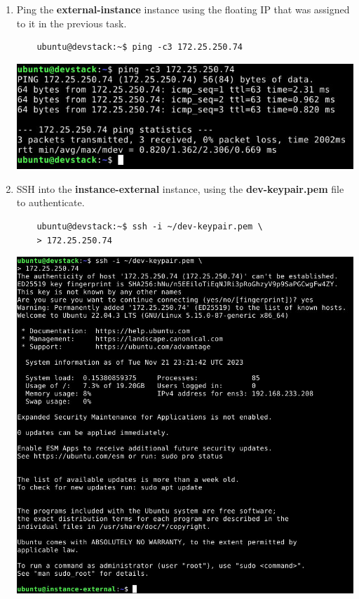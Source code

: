 \documentclass[letterpaper, 12pt]{article}
\begin{document}
\begin{enumerate}
    \item Ping the \textbf{external-instance} instance using the floating IP that was assigned to it in the previous
    task.
    \begin{lstlisting}
    ubuntu@devstack:~$ ping -c3 172.25.250.74
    \end{lstlisting}

    \begin{center}
        \includegraphics[width=\linewidth]{images/part6/step4.png}
    \end{center}

    \item SSH into the \textbf{instance-external} instance, using the \textbf{dev-keypair.pem} file to authenticate.
    \begin{lstlisting}
    ubuntu@devstack:~$ ssh -i ~/dev-keypair.pem \
    > 172.25.250.74
    \end{lstlisting}
 
    \begin{center}
        \includegraphics[width=\linewidth]{images/part6/step5.png}
    \end{center}


\end{enumerate}
\end{document}

